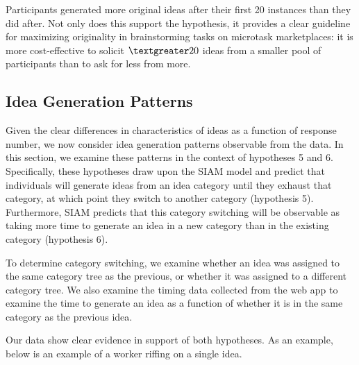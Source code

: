 Participants generated more original ideas after their first 20 instances than they did after. Not only does this support the hypothesis, it provides a clear guideline for maximizing originality in brainstorming tasks on microtask marketplaces: it is more cost-effective to solicit $\textgreater20$ ideas from a smaller pool of participants than to ask for less from more.




\subsection{Idea Generation Patterns}
Given the clear differences in characteristics of ideas as a function of response number, we now consider idea generation patterns observable from the data. In this section, we examine these patterns in the context of hypotheses 5 and 6. Specifically, these hypotheses draw upon the SIAM model and predict that individuals will generate ideas from an idea category until they exhaust that category, at which point they switch to another category (hypothesis 5). Furthermore, SIAM predicts that this category switching will be observable as taking more time to generate an idea in a new category than in the existing category (hypothesis 6).

To determine category switching, we examine whether an idea was assigned to the same category tree as the previous, or whether it was assigned to a different category tree. We also examine the timing data collected from the web app to examine the time to generate an idea as a function of whether it is in the same category as the previous idea.

Our data show clear evidence in support of both hypotheses. As an example, below is an example of a worker riffing on a single idea.



